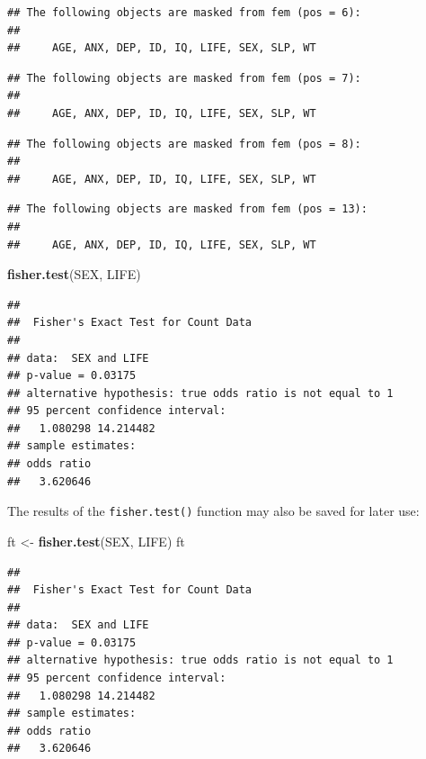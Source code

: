 \documentclass[]{book}
\newenvironment{Shaded}{\begin{snugshade}}{\end{snugshade}}
\newcommand{\KeywordTok}[1]{\textcolor[rgb]{0.13,0.29,0.53}{\textbf{#1}}}
\newcommand{\StringTok}[1]{\textcolor[rgb]{0.31,0.60,0.02}{#1}}
\newcommand{\NormalTok}[1]{#1}
\theoremstyle{definition}
\theoremstyle{definition}
\theoremstyle{definition}
\theoremstyle{remark}
\begin{document}
\begin{verbatim}
## The following objects are masked from fem (pos = 6):
## 
##     AGE, ANX, DEP, ID, IQ, LIFE, SEX, SLP, WT
\end{verbatim}

\begin{verbatim}
## The following objects are masked from fem (pos = 7):
## 
##     AGE, ANX, DEP, ID, IQ, LIFE, SEX, SLP, WT
\end{verbatim}

\begin{verbatim}
## The following objects are masked from fem (pos = 8):
## 
##     AGE, ANX, DEP, ID, IQ, LIFE, SEX, SLP, WT
\end{verbatim}

\begin{verbatim}
## The following objects are masked from fem (pos = 13):
## 
##     AGE, ANX, DEP, ID, IQ, LIFE, SEX, SLP, WT
\end{verbatim}

\begin{Shaded}
\begin{Highlighting}[]
\KeywordTok{fisher.test}\NormalTok{(SEX, LIFE)}
\end{Highlighting}
\end{Shaded}

\begin{verbatim}
## 
##  Fisher's Exact Test for Count Data
## 
## data:  SEX and LIFE
## p-value = 0.03175
## alternative hypothesis: true odds ratio is not equal to 1
## 95 percent confidence interval:
##   1.080298 14.214482
## sample estimates:
## odds ratio 
##   3.620646
\end{verbatim}

The results of the \texttt{fisher.test()} function may also be saved for
later use:

\begin{Shaded}
\begin{Highlighting}[]
\NormalTok{ft <-}\StringTok{ }\KeywordTok{fisher.test}\NormalTok{(SEX, LIFE)}
\NormalTok{ft}
\end{Highlighting}
\end{Shaded}

\begin{verbatim}
## 
##  Fisher's Exact Test for Count Data
## 
## data:  SEX and LIFE
## p-value = 0.03175
## alternative hypothesis: true odds ratio is not equal to 1
## 95 percent confidence interval:
##   1.080298 14.214482
## sample estimates:
## odds ratio 
##   3.620646
\end{verbatim}
\end{document}
